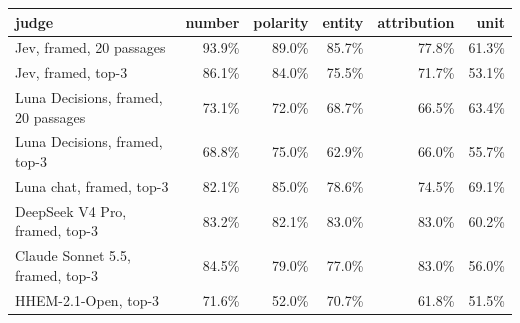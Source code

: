 \begin{tabular}{lrrrrr}
\toprule
judge & number & polarity & entity & attribution & unit \\
\midrule
Jev, framed, 20 passages & 93.9\% & 89.0\% & 85.7\% & 77.8\% & 61.3\% \\
Jev, framed, top-3 & 86.1\% & 84.0\% & 75.5\% & 71.7\% & 53.1\% \\
Luna Decisions, framed, 20 passages & 73.1\% & 72.0\% & 68.7\% & 66.5\% & 63.4\% \\
Luna Decisions, framed, top-3 & 68.8\% & 75.0\% & 62.9\% & 66.0\% & 55.7\% \\
Luna chat, framed, top-3 & 82.1\% & 85.0\% & 78.6\% & 74.5\% & 69.1\% \\
DeepSeek V4 Pro, framed, top-3 & 83.2\% & 82.1\% & 83.0\% & 83.0\% & 60.2\% \\
Claude Sonnet 5.5, framed, top-3 & 84.5\% & 79.0\% & 77.0\% & 83.0\% & 56.0\% \\
HHEM-2.1-Open, top-3 & 71.6\% & 52.0\% & 70.7\% & 61.8\% & 51.5\% \\
\bottomrule
\end{tabular}
